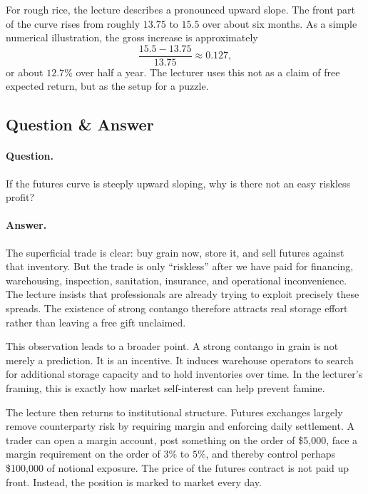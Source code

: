 For rough rice, the lecture describes a pronounced upward slope. The front part of the curve rises from roughly $13.75$ to $15.5$ over about six months. As a simple numerical illustration, the gross increase is approximately
\begin{equation}
\frac{15.5-13.75}{13.75} \approx 0.127,
\end{equation}
or about $12.7\%$ over half a year. The lecturer uses this not as a claim of free expected return, but as the setup for a puzzle.

\subsection{Question \& Answer}

\paragraph{Question.} If the futures curve is steeply upward sloping, why is there not an easy riskless profit?

\paragraph{Answer.} The superficial trade is clear: buy grain now, store it, and sell futures against that inventory. But the trade is only ``riskless'' after we have paid for financing, warehousing, inspection, sanitation, insurance, and operational inconvenience. The lecture insists that professionals are already trying to exploit precisely these spreads. The existence of strong contango therefore attracts real storage effort rather than leaving a free gift unclaimed.

This observation leads to a broader point. A strong contango in grain is not merely a prediction. It is an incentive. It induces warehouse operators to search for additional storage capacity and to hold inventories over time. In the lecturer's framing, this is exactly how market self-interest can help prevent famine.

The lecture then returns to institutional structure. Futures exchanges largely remove counterparty risk by requiring margin and enforcing daily settlement. A trader can open a margin account, post something on the order of \$5{,}000, face a margin requirement on the order of $3\%$ to $5\%$, and thereby control perhaps \$100{,}000 of notional exposure. The price of the futures contract is not paid up front. Instead, the position is marked to market every day.


